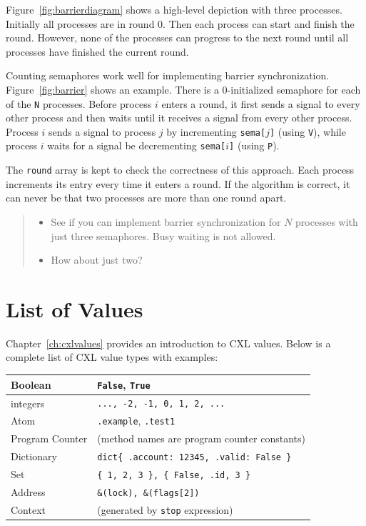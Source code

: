 \documentclass{report}
\begin{document}
Figure~\ref{fig:barrierdiagram} shows a high-level depiction with three
processes.  Initially all processes are in round 0.  Then each process
can start and finish the round.  However, none of the processes can
progress to the next round until all processes have finished the
current round.

Counting semaphores work well for implementing barrier synchronization.
Figure~\ref{fig:barrier} shows an example.  There is a 0-initialized
semaphore for each of the \texttt{N} processes.
Before process $i$ enters a round, it first sends a signal to every
other process and then waits until it receives a signal from
every other process.  Process $i$ sends a signal to process $j$
by incrementing \texttt{sema[$j$]} (using \texttt{V}),
while process $i$ waits for a signal be decrementing \texttt{sema[$i$]}
(using \texttt{P}).

The \texttt{round} array is kept to check the correctness of this
approach.  Each process increments its entry every time it enters
a round.  If the algorithm is correct, it can never be that two processes
are more than one round apart.

\begin{quote}
\begin{itemize}
\item See if you can implement barrier synchronization for $N$ processes
with just three semaphores.  Busy waiting is not allowed.
\item How about just two?
\end{itemize}
\end{quote}




\appendix

\chapter{List of Values}

Chapter~\ref{ch:cxlvalues} provides an introduction to CXL values.
Below is a complete list of CXL value types with examples:

\vspace{1em}
\begin{tabular}{|l|l|}
\hline
Boolean & \texttt{False}, \texttt{True} \\
\hline
integers & \texttt{..., -2, -1, 0, 1, 2, ...} \\
\hline
Atom & \texttt{.example}, \texttt{.test1} \\
\hline
Program Counter & (method names are program counter constants) \\
\hline
Dictionary & \texttt{dict\{ .account: 12345, .valid: False \} } \\
\hline
Set & \texttt{\{ 1, 2, 3 \}, \{ False, .id, 3 \} } \\
\hline
Address & \texttt{\&(lock), \&(flags[2])} \\
\hline
Context & (generated by \texttt{stop} expression) \\
\hline
\end{tabular}
\vspace{1em}
\end{document}
